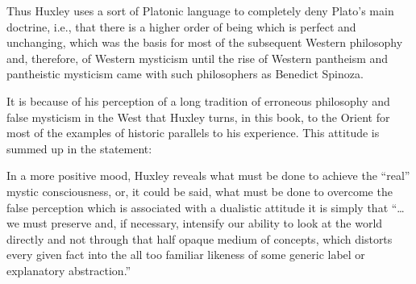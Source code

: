 Thus Huxley uses a sort of Platonic language to completely
deny Plato's main doctrine, i.e., that there is a higher order
of being which is perfect and unchanging, which was the basis
for most of the subsequent Western philosophy and, therefore,
of Western mysticism until the rise of Western pantheism and
pantheistic mysticism came with such philosophers as Benedict Spinoza.

It is because of his perception of a long tradition of
erroneous philosophy and false mysticism in the West that
Huxley turns, in this book, to the Orient for most of the
examples of historic parallels to his experience. This attitude
is summed up in the statement:


In a more positive mood, Huxley reveals what must be done to achieve
the \enquote{real} mystic consciousness, or, it could be said, what must be done to overcome the
false perception which is associated with a dualistic attitude it is simply
that \enquote{\dots we must preserve and, if necessary, intensify our
ability to look at the world directly and not through that
half opaque medium of concepts, which distorts every given fact into the
all too familiar likeness of some generic label or explanatory abstraction.}\supercite{huxley:doors-of-perception}

\label{self:10}

